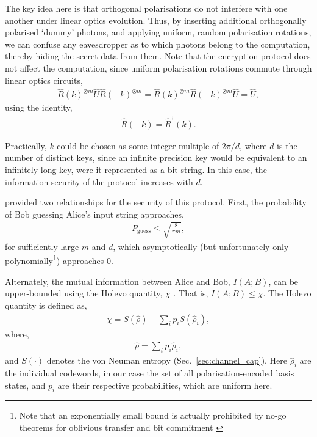 The key idea here is that orthogonal polarisations do not interfere with one another under linear optics evolution. Thus, by inserting additional orthogonally polarised `dummy' photons, and applying uniform, random polarisation rotations, we can confuse any eavesdropper as to which photons belong to the computation, thereby hiding the secret data from them. Note that the encryption protocol does not affect the computation, since uniform polarisation rotations commute through linear optics circuits,
\begin{align} \label{eq:LO_key_commute}
\hat{R}(k)^{\otimes m} \hat{U} \hat{R}(-k)^{\otimes m} = \hat{R}(k)^{\otimes m} \hat{R}(-k)^{\otimes m} \hat{U} = \hat{U},
\end{align}
using the identity,
\begin{align}
\hat{R}(-k) = \hat{R}^\dag(k).	
\end{align}

Practically, $k$ could be chosen as some integer multiple of \mbox{$2\pi/d$}, where $d$ is the number of distinct keys, since an infinite precision key would be equivalent to an infinitely long key, were it represented as a bit-string. In this case, the information security of the protocol increases with $d$.

\cite{bib:RohdeQWEnc12} provided two relationships for the security of this protocol. First, the probability of Bob guessing Alice's input string approaches,
\begin{align}
P_\text{guess} \leq \sqrt{\frac{8}{\pi m}},
\end{align}
for sufficiently large $m$ and $d$, which asymptotically (but unfortunately only polynomially\footnote{Note that an exponentially small bound is actually prohibited by no-go theorems for oblivious transfer and bit commitment \cite{bib:HKLo97, bib:SpekkensRudolphSecure}}) approaches 0.

Alternately, the mutual information between Alice and Bob, \mbox{$I(A;B)$}, can be upper-bounded using the Holevo quantity, $\chi$ \cite{HolevoQuantity}. That is, \mbox{$I(A;B)\leq\chi$}. The Holevo quantity is defined as,
\begin{align}
\chi = S(\hat\rho) - \sum_i p_i S(\hat\rho_i),
\end{align}
where,
\begin{align}
\hat\rho = \sum_i p_i \hat\rho_i,
\end{align}
and $S(\cdot)$ denotes the von Neuman entropy (Sec.~\ref{sec:channel_cap}). Here $\hat\rho_i$ are the individual codewords, in our case the set of all polarisation-encoded basis states, and $p_i$ are their respective probabilities, which are uniform here.


